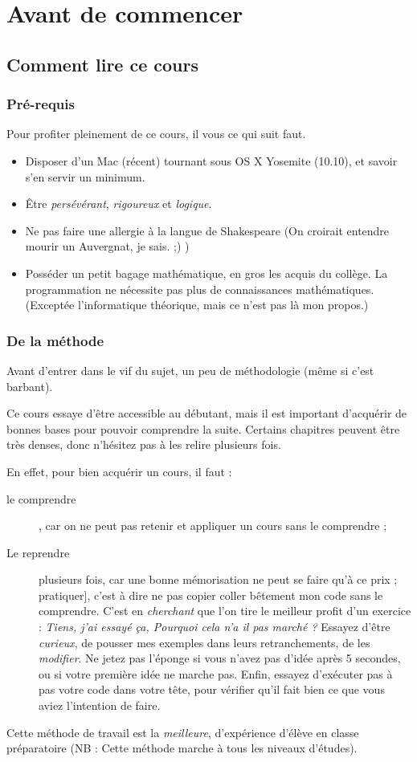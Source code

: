 \chapter{Avant de commencer}

\section{Comment lire ce cours}
\subsection{Pré-requis}
Pour profiter pleinement de ce cours, il vous ce qui suit faut.
\begin{itemize}
\item Disposer d'un Mac (récent) tournant sous OS X Yosemite (10.10),
et savoir s'en servir un minimum.
\item Être \emph{persévérant}, \emph{rigoureux} et \emph{logique}.
\item Ne pas faire une allergie à la langue de Shakespeare
(On croirait entendre mourir un Auvergnat, je sais. ;) )
\item Posséder un petit bagage mathématique, en gros les acquis du collège.
La programmation ne nécessite pas plus de connaissances mathématiques.
(Exceptée l'informatique théorique, mais ce n'est pas là mon propos.) 
\end{itemize}

\subsection{De la méthode}
Avant d'entrer dans le vif du sujet,
un peu de méthodologie (même si c'est barbant).


Ce cours essaye d'être accessible au débutant,
mais il est important d'acquérir de bonnes bases
pour pouvoir comprendre la suite.
Certains chapitres peuvent être très denses,
donc n'hésitez pas à les relire plusieurs fois.


En effet, pour bien acquérir un cours, il faut :
\begin{description}
\item[le comprendre],
car on ne peut pas retenir et appliquer un cours sans le comprendre ;
\item[Le reprendre] plusieurs fois,
car une bonne mémorisation ne peut se faire qu'à ce prix ;
\itemlLe pratiquer],
c'est à dire ne pas copier coller bêtement mon code sans le comprendre.
C'est en \emph{cherchant} que l'on tire le meilleur profit d'un exercice :
\og \emph{Tiens, j'ai essayé ça, Pourquoi cela n'a il pas marché ?} \fg{}
Essayez d'être \emph{curieux}, de pousser mes exemples dans leurs retranchements,
de les \emph{modifier}. Ne jetez pas l'éponge si vous n'avez pas d'idée après 5 secondes,
ou si votre première idée ne marche pas.
Enfin, essayez d'exécuter pas à pas votre code dans votre tête,
pour vérifier qu'il fait bien ce que vous aviez l'intention de faire.
\end{description}
Cette méthode de travail est la \emph{meilleure}, d'expérience d'élève en classe préparatoire
(NB : Cette méthode marche à tous les niveaux d'études).
